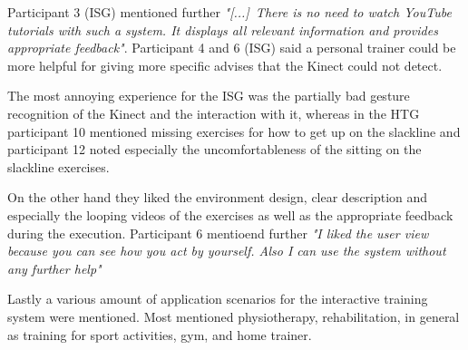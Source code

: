Participant 3 (ISG) mentioned further \textit{"[...]~There is no need to watch YouTube tutorials with such a system. It displays all relevant information and provides appropriate feedback"}.
Participant 4 and 6 (ISG) said a personal trainer could be more helpful for giving more specific advises that the Kinect could not detect.

The most annoying experience for the ISG was the partially bad gesture recognition of the Kinect and the interaction with it, whereas in the HTG participant 10 mentioned missing exercises for how to get up on the slackline and participant 12 noted especially the uncomfortableness of the sitting on the slackline exercises.

On the other hand they liked the environment design, clear description and especially the looping videos of the exercises as well as the appropriate feedback during the execution.
Participant 6 mentioend further \textit{"I liked the user view because you can see how you act by yourself. Also I can use the system without any further help"}

Lastly a various amount of application scenarios for the interactive training system were mentioned.
Most mentioned physiotherapy, rehabilitation, in general as training for sport activities, gym, and home trainer.